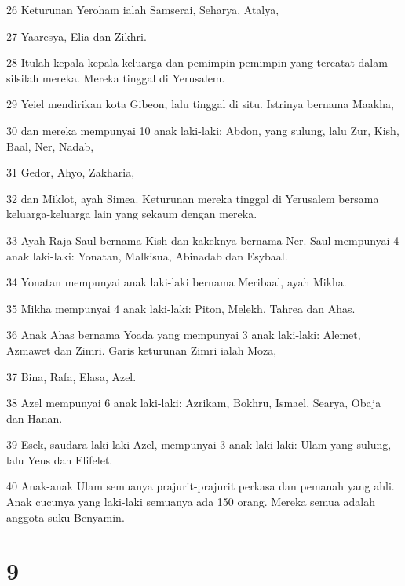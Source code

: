 \par 26 Keturunan Yeroham ialah Samserai, Seharya, Atalya,
\par 27 Yaaresya, Elia dan Zikhri.
\par 28 Itulah kepala-kepala keluarga dan pemimpin-pemimpin yang tercatat dalam silsilah mereka. Mereka tinggal di Yerusalem.
\par 29 Yeiel mendirikan kota Gibeon, lalu tinggal di situ. Istrinya bernama Maakha,
\par 30 dan mereka mempunyai 10 anak laki-laki: Abdon, yang sulung, lalu Zur, Kish, Baal, Ner, Nadab,
\par 31 Gedor, Ahyo, Zakharia,
\par 32 dan Miklot, ayah Simea. Keturunan mereka tinggal di Yerusalem bersama keluarga-keluarga lain yang sekaum dengan mereka.
\par 33 Ayah Raja Saul bernama Kish dan kakeknya bernama Ner. Saul mempunyai 4 anak laki-laki: Yonatan, Malkisua, Abinadab dan Esybaal.
\par 34 Yonatan mempunyai anak laki-laki bernama Meribaal, ayah Mikha.
\par 35 Mikha mempunyai 4 anak laki-laki: Piton, Melekh, Tahrea dan Ahas.
\par 36 Anak Ahas bernama Yoada yang mempunyai 3 anak laki-laki: Alemet, Azmawet dan Zimri. Garis keturunan Zimri ialah Moza,
\par 37 Bina, Rafa, Elasa, Azel.
\par 38 Azel mempunyai 6 anak laki-laki: Azrikam, Bokhru, Ismael, Searya, Obaja dan Hanan.
\par 39 Esek, saudara laki-laki Azel, mempunyai 3 anak laki-laki: Ulam yang sulung, lalu Yeus dan Elifelet.
\par 40 Anak-anak Ulam semuanya prajurit-prajurit perkasa dan pemanah yang ahli. Anak cucunya yang laki-laki semuanya ada 150 orang. Mereka semua adalah anggota suku Benyamin.

\chapter{9}

